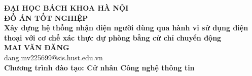 \documentclass[main.tex]{subfiles}
\begin{document}
\begin{titlepage}
\thispagestyle{empty}
\begin{center}

{\textbf{\large{ĐẠI HỌC BÁCH KHOA HÀ NỘI}}}\\[3.5cm]

{\textbf{\huge{ ĐỒ ÁN TỐT NGHIỆP}}}\\[1cm]
{\textbf{\Large{Xây dựng hệ thống nhận diện người dùng qua hành vi sử dụng điện thoại với cơ chế xác thực dự phòng bằng cử chỉ chuyển động}}}\\[1cm]

{\textbf{\large{MAI VĂN ĐĂNG}}}\\
{\large{dang.mv225699@sis.hust.edu.vn}}\\[0.5cm] %

{\textbf{\large{Chương trình đào tạo: Cử nhân Công nghệ thông tin}}}%

\vspace{3.5cm}
\begin{table}[H]
\centering
{}
\end{table}
\end{center}



\end{titlepage}
\end{document}
